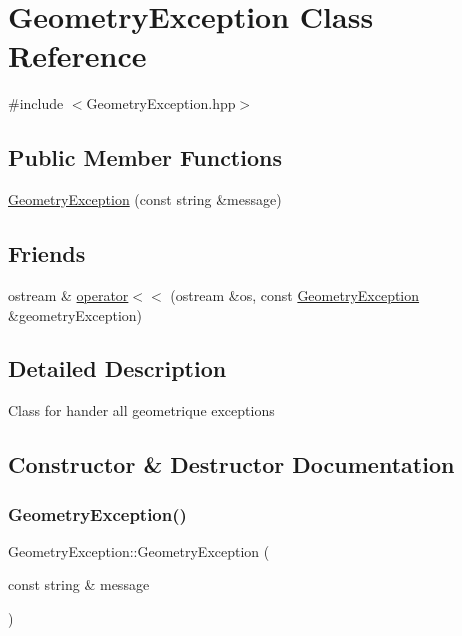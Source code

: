 \hypertarget{class_geometry_exception}{}\section{Geometry\+Exception Class Reference}
\label{class_geometry_exception}


{\ttfamily \#include $<$Geometry\+Exception.\+hpp$>$}

\subsection*{Public Member Functions}
\begin{DoxyCompactItemize}
\item 
\hyperlink{class_geometry_exception_a15e945c91a8d6aaa1a2d18edd9f7971f}{Geometry\+Exception} (const string \&message)
\end{DoxyCompactItemize}
\subsection*{Friends}
\begin{DoxyCompactItemize}
\item 
ostream \& \hyperlink{class_geometry_exception_a1a0e9b6dde275e9a72dd6538ab4a7b73}{operator$<$$<$} (ostream \&os, const \hyperlink{class_geometry_exception}{Geometry\+Exception} \&geometry\+Exception)
\end{DoxyCompactItemize}


\subsection{Detailed Description}
Class for hander all geometrique exceptions 

\subsection{Constructor \& Destructor Documentation}
\hypertarget{class_geometry_exception_a15e945c91a8d6aaa1a2d18edd9f7971f}{}\label{class_geometry_exception_a15e945c91a8d6aaa1a2d18edd9f7971f} 
\subsubsection{\texorpdfstring{Geometry\+Exception()}{GeometryException()}}
{\footnotesize\ttfamily Geometry\+Exception\+::\+Geometry\+Exception (\begin{DoxyParamCaption}\item[{const string \&}]{message }\end{DoxyParamCaption})}

